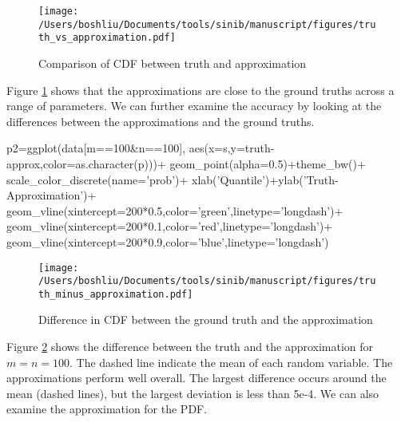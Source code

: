 
\begin{figure}[h]
\texttt{[image: /Users/boshliu/Documents/tools/sinib/manuscript/figures/truth\_vs\_approximation.pdf]}
\caption{Comparison of CDF between truth and approximation}
\label{fig:1}
\end{figure}

Figure \ref{fig:1} shows that the approximations are close to the ground truths across a range of parameters. We can further examine the accuracy by looking at the differences between the approximations and the ground truths. 

\begin{example}
p2=ggplot(data[m==100&n==100],
	aes(x=s,y=truth-approx,color=as.character(p)))+
	geom_point(alpha=0.5)+theme_bw()+
	scale_color_discrete(name='prob')+
	xlab('Quantile')+ylab('Truth-Approximation')+
	geom_vline(xintercept=200*0.5,color='green',linetype='longdash')+
	geom_vline(xintercept=200*0.1,color='red',linetype='longdash')+
	geom_vline(xintercept=200*0.9,color='blue',linetype='longdash')
\end{example}

\begin{figure}[h]
\texttt{[image: /Users/boshliu/Documents/tools/sinib/manuscript/figures/truth\_minus\_approximation.pdf]}
\caption{Difference in CDF between the ground truth and the approximation}
\label{fig:2}
\end{figure}


Figure \ref{fig:2} shows the difference between the truth and the approximation for $m=n=100$. The dashed line indicate the mean of each random variable. The approximations perform well overall. The largest difference occurs around the mean (dashed lines), but the largest deviation is less than 5e-4. We can also examine the approximation for the PDF. 

